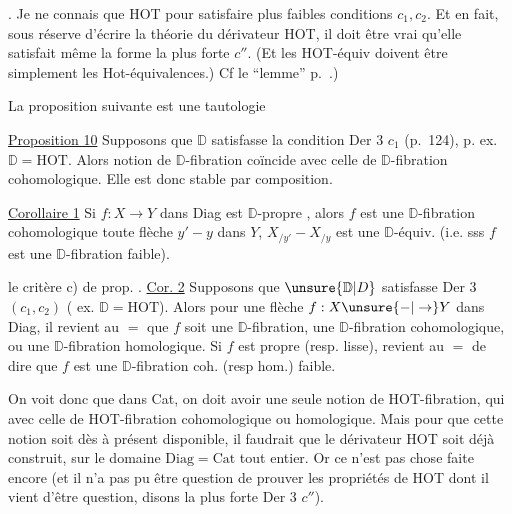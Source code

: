 . Je ne connais que HOT pour satisfaire   plus faibles conditions $c_1,c_2$. Et en fait, sous réserve d'écrire la théorie du dérivateur HOT, il doit être vrai qu'elle satisfait même la forme la plus forte $c''$. (Et les HOT-équiv doivent être simplement les Hot-équivalences.) Cf le ``lemme'' p.~.)

La proposition suivante est une tautologie

\uline{Proposition 10} Supposons que $\mathbb D$ satisfasse la condition Der 3 $c_1$ (p.~124), p. ex. $\mathbb D=\mathrm{HOT}$. Alors  notion de $\mathbb D$-fibration coïncide avec celle de $\mathbb D$-fibration cohomologique. Elle est donc stable par composition. 

\uline{Corollaire 1} Si $f:X\to Y$ dans Diag est $\mathbb D$-propre , alors $f$ est une $\mathbb D$-fibration cohomologique   toute flèche $y'-y$ dans $Y$, $X_{/y'}-X_{/y}$ est une $\mathbb D$-équiv. (i.e. sss $f$ est une $\mathbb D$-fibration  faible).

 le critère c) de prop. .
\uline{Cor. 2} Supposons que $\unsure{\mathbb D|D}$ satisfasse Der 3 $(c_1,c_2)$ ( ex. $\mathbb D=\mathrm{HOT}$). Alors  pour une flèche $f:X\unsure{\mathord{-}|\to}Y$ dans Diag, il revient au $=$ que $f$ soit une  $\mathbb D$-fibration, une $\mathbb D$-fibration cohomologique, ou une $\mathbb D$-fibration homologique. Si $f$ est propre (resp. lisse),  revient au $=$ de dire que $f$ est une $\mathbb D$-fibration coh. (resp hom.) faible.



On voit donc que dans Cat, on doit avoir une seule notion  de HOT-fibration, qui  avec celle de HOT-fibration cohomologique ou homologique. Mais pour que cette notion soit dès à présent disponible, il faudrait que le dérivateur HOT soit déjà construit, sur le domaine $\mathrm{Diag}=\mathrm{Cat}$ tout entier. Or ce n'est pas chose faite encore (et il n'a  pas pu être question de prouver les propriétés de HOT dont il vient d'être question, disons la plus forte Der 3 $c''$).

